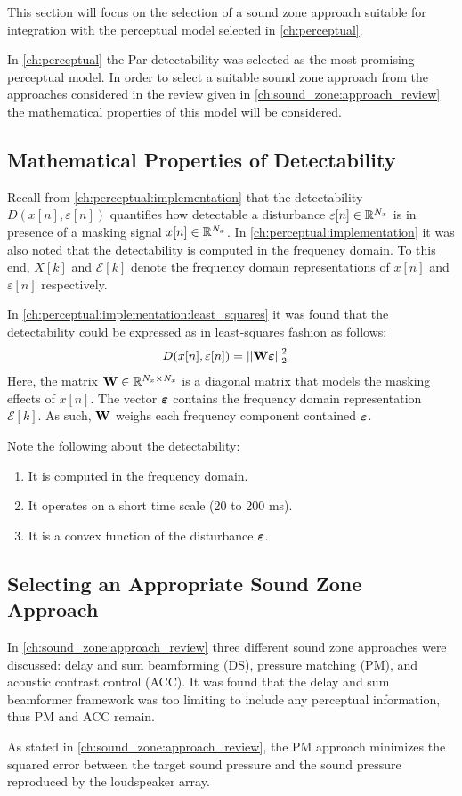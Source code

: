 This section will focus on the selection of a sound zone approach suitable for integration with the perceptual model selected in \autoref{ch:perceptual}.

In \autoref{ch:perceptual} the Par detectability was selected as the most promising perceptual model.
In order to select a suitable sound zone approach from the approaches considered in the review given in \autoref{ch:sound_zone:approach_review} the 
mathematical properties of this model will be considered.

\subsection{Mathematical Properties of Detectability}
Recall from \autoref{ch:perceptual:implementation} that the detectability $D(x[n],\varepsilon[n])$ quantifies how detectable a disturbance
$\varepsilon[n]\in\mathbb{R}^{N_x}$ is in presence of a masking signal $x[n]\in\mathbb{R}^{N_x}$.
In \autoref{ch:perceptual:implementation} it was also noted that the detectability is computed in the frequency domain.
To this end, $X[k]$ and $\mathcal{E}[k]$ denote the frequency domain representations of $x[n]$ and $\varepsilon[n]$ respectively.

In \autoref{ch:perceptual:implementation:least_squares} it was found that the detectability could be expressed as in least-squares fashion as follows:
\begin{align}
    D(x[n],\varepsilon[n]) &= \norm[2][2]{\mat{W}\vecsymbol{\varepsilon}} 
\end{align}
Here, the matrix $\mathbf{W}\in\mathbb{R}^{N_x \times N_x}$ is a diagonal matrix that models the masking effects of $x[n]$.
The vector $\boldsymbol{\varepsilon}$ contains the frequency domain representation $\mathcal{E}[k]$.
As such, $\mathbf{W}$ weighs each frequency component contained $\boldsymbol{\varepsilon}$.

Note the following about the detectability:
\begin{enumerate}
    \item It is computed in the frequency domain. 
    \item It operates on a short time scale (20 to 200 ms).
    \item It is a convex function of the disturbance $\boldsymbol{\varepsilon}$.
\end{enumerate}

\subsection{Selecting an Appropriate Sound Zone Approach}
In \autoref{ch:sound_zone:approach_review} three different sound zone approaches were discussed: delay and sum beamforming (DS), pressure matching (PM),
and acoustic contrast control (ACC).
It was found that the delay and sum beamformer framework was too limiting to include any perceptual information, thus PM and ACC remain.

As stated in \autoref{ch:sound_zone:approach_review}, the PM approach minimizes the squared error between the target sound pressure and the 
sound pressure reproduced by the loudspeaker array.

